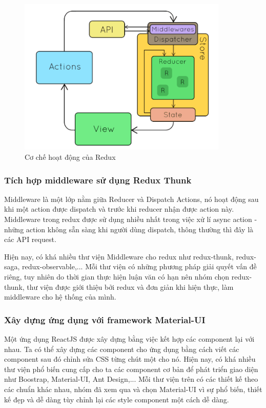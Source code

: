 \begin{figure}[h!]
    \begin{center}
        \includegraphics[width=10cm]{Image/Technical/redux-flow.png}
        \caption{Cơ chế hoạt động của Redux}
        \label{redux-flow}
    \end{center}
\end{figure}

\subsubsection{Tích hợp middleware sử dụng Redux Thunk}

Middleware là một lớp nằm giữa Reducer và Dispatch Actions, nó hoạt động sau khi một action được dispatch và trước khi reducer nhận được action này. Middleware trong redux được sử dụng nhiều nhất trong việc xử lí async action - những action không sẵn sàng khi người dùng dispatch, thông thường thì đây là các API request.\par

Hiện nay, có khá nhiều thư viện Middleware cho redux như redux-thunk, redux-saga, redux-observable,... Mỗi thư viện có những phương pháp giải quyết vấn đề riêng, tuy nhiên do thời gian thực hiện luận văn có hạn nên nhóm chọn redux-thunk, thư viện được giới thiệu bởi redux và đơn giản khi hiện thực, làm middleware cho hệ thống của mình.

\subsubsection{Xây dựng ứng dụng với framework Material-UI}

Một ứng dụng ReactJS được xây dựng bằng việc kết hợp các component lại với nhau. Ta có thể xây dựng các component cho ứng dụng bằng cách viết các component sau đó chỉnh sửa CSS từng chút một cho nó. Hiện nay, có khá nhiều thư viện phổ biến cung cấp cho ta các component cơ bản để phát triển giao diện như Boostrap, Material-UI, Ant Design,... Mỗi thư viện trên có các thiết kế theo các chuẩn khác nhau, nhóm đã xem qua và chọn Material-UI vì sự phổ biến, thiết kế đẹp và dễ dàng tùy chỉnh lại các style component một cách dễ dàng.\par
